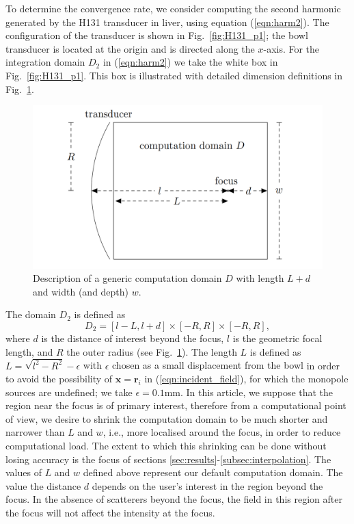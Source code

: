 \documentclass[preprint]{JASA}
\newcommand{\br}{\mathbf{r}}
\newcommand{\bx}{\mathbf{x}}
\newcommand{\red}[1]{{\color{red} #1}}
\begin{document}
To determine the convergence rate, we consider computing the second harmonic 
generated by the H131 transducer in liver, using equation (\ref{eqn:harm2}).
The configuration of the transducer is shown in Fig.~\ref{fig:H131_p1}; the bowl
transducer is located at the origin and is directed along the $x$-axis.
For the integration domain $D_2$ in (\ref{eqn:harm2}) we take the white box in 
Fig.~\ref{fig:H131_p1}. This box is illustrated with detailed dimension definitions 
in Fig.~\ref{fig:domain_dimensions}. 
\begin{figure}
    \includegraphics[width=\columnwidth]{figures/schematic_domain_dimensions_no_r.pdf}
    \caption{Description of a generic computation domain $D$
    with length $L+d$ and width (and depth) $w$.}
    \label{fig:domain_dimensions}
\end{figure}
The domain $D_2$ is defined as 
\begin{equation}
    D_2 = [l-L, l+d] \times [-R, R] \times [-R, R],
    \label{eqn:domain}
\end{equation}
where $d$ is the distance of interest beyond the focus, $l$ is the geometric 
focal length, and $R$ the outer radius (see Fig.~\ref{fig:domain_dimensions}).
The length $L$ is defined as $L = \sqrt{l^2-R^2} - \epsilon$ with $\epsilon$ 
chosen as a small displacement 
from the bowl \red{in order to avoid the possibility of $\bx=\br_i$ in (\ref{eqn:incident_field}),
for which the monopole sources are undefined}; we take $\epsilon = 0.1$mm. 
\red{In this article, we suppose that the region near the focus is of 
primary interest, therefore from a computational point of view, we desire to 
shrink the computation domain to be much shorter and narrower than $L$ and $w$, i.e., 
more localised around the focus, in order to reduce computational load.
The extent to which this shrinking can be done without losing accuracy is the focus 
of sections \ref{sec:results}-\ref{subsec:interpolation}. The values of $L$ and $w$
defined above represent our default computation domain. The value the distance $d$
depends on the user's interest in the region beyond the focus. In the absence of 
scatterers beyond the focus, the field in this region after the focus will not affect the 
intensity at the focus.}
\end{document}
